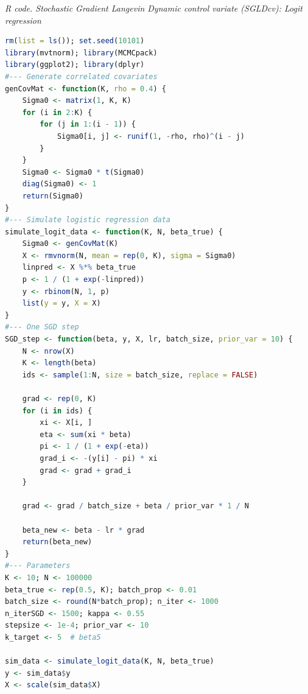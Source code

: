 \begin{enumerate}[leftmargin=*]
\begin{tcolorbox}[enhanced,width=4.67in,center upper,
	fontupper=\large\bfseries,drop shadow southwest,sharp corners]
	\textit{R code. Stochastic Gradient Langevin Dynamic control variate (SGLDcv): Logit regression}
	\begin{VF}
		\begin{lstlisting}[language=R]
rm(list = ls()); set.seed(10101)
library(mvtnorm); library(MCMCpack)
library(ggplot2); library(dplyr)
#--- Generate correlated covariates
genCovMat <- function(K, rho = 0.4) {
	Sigma0 <- matrix(1, K, K)
	for (i in 2:K) {
		for (j in 1:(i - 1)) {
			Sigma0[i, j] <- runif(1, -rho, rho)^(i - j)
		}
	}
	Sigma0 <- Sigma0 * t(Sigma0)
	diag(Sigma0) <- 1
	return(Sigma0)
}
#--- Simulate logistic regression data
simulate_logit_data <- function(K, N, beta_true) {
	Sigma0 <- genCovMat(K)
	X <- rmvnorm(N, mean = rep(0, K), sigma = Sigma0)
	linpred <- X %*% beta_true
	p <- 1 / (1 + exp(-linpred))
	y <- rbinom(N, 1, p)
	list(y = y, X = X)
}
#--- One SGD step
SGD_step <- function(beta, y, X, lr, batch_size, prior_var = 10) {
	N <- nrow(X)
	K <- length(beta)
	ids <- sample(1:N, size = batch_size, replace = FALSE)
	
	grad <- rep(0, K)
	for (i in ids) {
		xi <- X[i, ]
		eta <- sum(xi * beta)
		pi <- 1 / (1 + exp(-eta))
		grad_i <- -(y[i] - pi) * xi
		grad <- grad + grad_i
	}
	
	grad <- grad / batch_size + beta / prior_var * 1 / N 
	
	beta_new <- beta - lr * grad
	return(beta_new)
}
#--- Parameters
K <- 10; N <- 100000
beta_true <- rep(0.5, K); batch_prop <- 0.01
batch_size <- round(N*batch_prop); n_iter <- 1000
n_iterSGD <- 1500; kappa <- 0.55
stepsize <- 1e-4; prior_var <- 10
k_target <- 5  # beta5

sim_data <- simulate_logit_data(K, N, beta_true)
y <- sim_data$y
X <- scale(sim_data$X)
\end{lstlisting}
	\end{VF}
\end{tcolorbox}



\end{enumerate}
